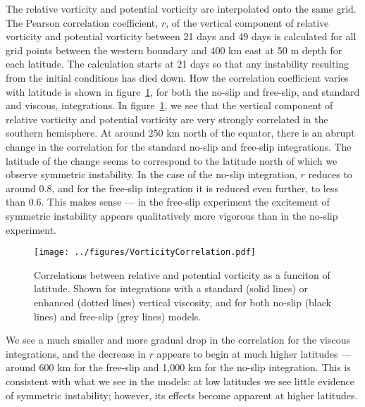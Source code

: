     The relative vorticity and potential vorticity are interpolated onto the same grid. The Pearson correlation coefficient, $r$, of the vertical component of relative vorticity and potential vorticity between 21 days and 49 days is calculated for all grid points between the western boundary and 400 km east at 50 m depth for each latitude. The calculation starts at 21 days so that any instability resulting from the initial conditions has died down. How the correlation coefficient varies with latitude is shown in figure~\ref{fig:VorticityCorrelations}, for both the no-slip and free-slip, and standard and viscous, integrations.
    In figure~\ref{fig:VorticityCorrelations}, we see that the vertical component of relative vorticity and potential vorticity are very strongly correlated in the southern hemisphere. At around 250 km north of the equator, there is an abrupt change in the correlation for the standard no-slip and free-slip integrations. The latitude of the change seems to correspond to the latitude north of which we observe symmetric instability. In the case of the no-slip integration, $r$ reduces to around 0.8, and for the free-slip integration it is reduced even further, to less than 0.6. This makes sense --- in the free-slip experiment the excitement of symmetric instability appears qualitatively more vigorous than in the no-slip experiment.

    \begin{figure} 
        \centering
        \texttt{[image: ../figures/VorticityCorrelation.pdf]}
        \caption{Correlations between relative and potential vorticity as a funciton of latitude. Shown for integrations with a standard (solid lines) or enhanced (dotted lines) vertical viscosity, and for both no-slip (black lines) and free-slip (grey lines) models.}
        \label{fig:VorticityCorrelations}
    \end{figure}

    We see a much smaller and more gradual drop in the correlation for the viscous integrations, and the decrease in $r$ appears to begin at much higher latitudes --- around 600 km for the free-slip and 1,000 km for the no-slip integration. This is consistent with what we see in the models: at low latitudes we see little evidence of symmetric instability; however, its effects become apparent at higher latitudes.

